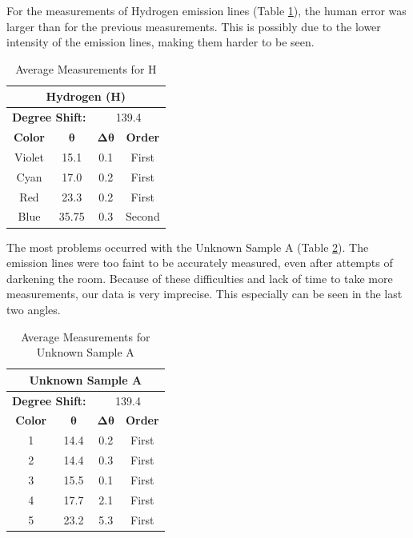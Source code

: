 \documentclass[a4paper, twocolumn]{article}
\begin{document}
For the measurements of Hydrogen emission lines (Table \ref{table:anglesH}), the human error was larger than for the 
previous measurements. This is possibly due to the lower intensity of the emission lines, making them harder to be seen.
\begin{table}[h!]
\centering
\begin{tabular}{ |c||c|c|c| }
 \hline
 \multicolumn{4}{|c|}{\textbf{Hydrogen (H)}} \\
 \hline
 \multicolumn{2}{|c}{\textbf{Degree Shift:}} &
 \multicolumn{2}{|c|}{139.4} \\
 \hline
 \textbf{Color} & $\boldsymbol{\theta}$ & $\boldsymbol{\Delta\theta}$ & \textbf{Order} \\
 \hline
 Violet & 15.1 & 0.1 & First \\
 \hline
 Cyan & 17.0 & 0.2 & First \\ 
 \hline
 Red & 23.3 & 0.2 & First \\
 \hline
 Blue & 35.75 & 0.3 & Second \\
 \hline
\end{tabular}
\caption{Average Measurements for H}
\label{table:anglesH}
\end{table}
\vfill\eject
The most problems occurred with the Unknown Sample A (Table \ref{table:anglesA}). The emission lines were too faint to be accurately measured, even after
attempts of darkening the room. Because of these difficulties and lack of time to take more measurements, our data is very
imprecise. This especially can be seen in the last two angles.
\begin{table}[h!]
\centering
\begin{tabular}{ |c||c|c|c| }
 \hline
 \multicolumn{4}{|c|}{\textbf{Unknown Sample A}} \\
 \hline
 \multicolumn{2}{|c}{\textbf{Degree Shift:}} &
 \multicolumn{2}{|c|}{139.4} \\
 \hline
 \textbf{Color} & $\boldsymbol{\theta}$ & $\boldsymbol{\Delta\theta}$ & \textbf{Order} \\
 \hline
 1 & 14.4 & 0.2 & First \\
 \hline
 2 & 14.4 & 0.3 & First \\
 \hline
 3 & 15.5 & 0.1 & First \\
 \hline
 4 & 17.7 & 2.1 & First \\
 \hline
 5 & 23.2 & 5.3 & First \\
 \hline
\end{tabular}
\caption{Average Measurements for Unknown Sample A}
\label{table:anglesA}
\end{table}
\end{document}
